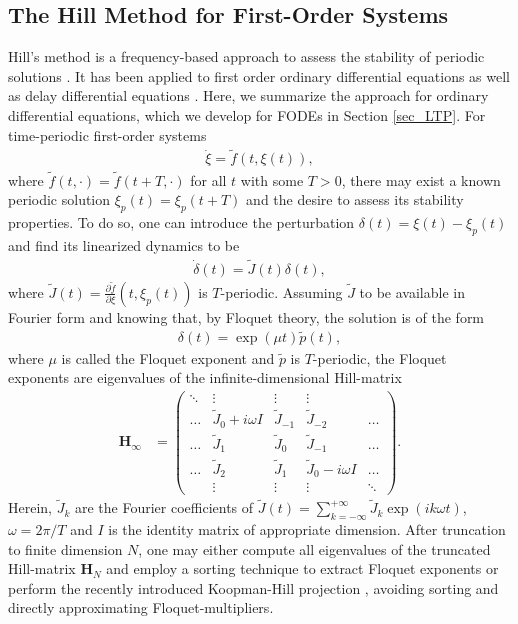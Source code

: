 \documentclass{svproc}
\newcommand{\hMat}{\mathbf H}
\begin{document}
\subsection{{The Hill Method for First-Order Systems}}
{ Hill's method is a frequency-based approach to assess the stability of periodic solutions \cite{Zhou2002}. It has been applied to first order ordinary differential equations as well as delay differential equations \cite{Stepan2011}. Here, we summarize the approach for ordinary differential equations, which we develop for FODEs in Section \ref{sec_LTP}. For time-periodic first-order systems
	\begin{align}
		\dot \xi = \tilde f(t,\xi(t)),
	\end{align}
	where $\tilde f(t,\cdot) = \tilde f(t+T,\cdot)$ for all $t$ with some $T>0$, there may exist a known periodic solution $\xi_p(t) = \xi_p(t+T)$ and the desire to assess its stability properties. To do so, one can introduce the perturbation $\delta(t) = \xi(t)-\xi_p(t)$ and find its linearized dynamics to be
	\begin{align}
		\dot \delta (t) = \tilde J (t) \delta (t),
	\end{align}
	where $\tilde J(t) = \frac{\partial \tilde f}{\partial \xi}(t,\xi_p(t))$ is $T$-periodic. Assuming $\tilde J$ to be available in Fourier form and knowing that, by Floquet theory, the solution is of the form
	\begin{align}
		\delta(t) = \exp(\mu t)\tilde p(t),
	\end{align}
	where $\mu$ is called the Floquet exponent and $\tilde p$ is $T$-periodic, the Floquet exponents are eigenvalues of the infinite-dimensional Hill-matrix
	\begin{align}\label{eq_Hillmat}
		\hMat_\infty &= \begin{pmatrix}
			\ddots & \vdots & \vdots & \vdots & \\
			\dots & \tilde J_0 + i\omega I & \tilde J_{-1} & \tilde J_{-2} & \dots\\
			\dots & \tilde J_1 & \tilde J_0  & \tilde J_{-1} & \dots\\
			\dots & \tilde J_{2} & \tilde J_{1} & \tilde J_0 -i\omega I & \dots\\
			& \vdots & \vdots & \vdots & \ddots
		\end{pmatrix}.
	\end{align}
	Herein, $\tilde J_k$ are the Fourier coefficients of $\tilde J(t) = \sum_{k=-\infty}^{+\infty}\tilde J_k \exp(ik\omega t)$, $\omega = 2\pi / T$ and $I$ is the identity matrix of appropriate dimension. After truncation to finite dimension $N$, one may either compute all eigenvalues of the truncated Hill-matrix $\hMat_N$ and employ a sorting technique to extract Floquet exponents or perform the recently introduced Koopman-Hill projection \cite{Bayer2023a}, avoiding sorting and directly approximating Floquet-multipliers.}
\end{document}
